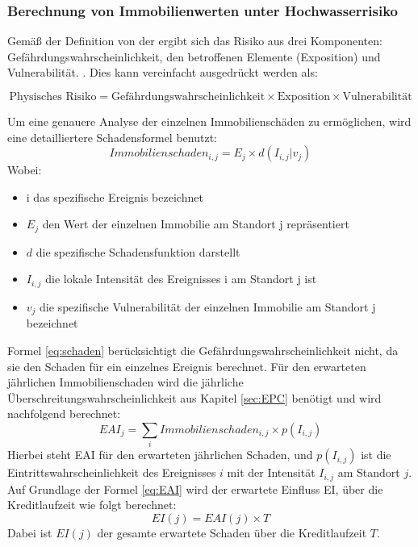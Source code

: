\subsubsection{Berechnung von Immobilienwerten unter Hochwasserrisiko}
Gemäß der Definition von der \textcite{undro1979} ergibt sich das Risiko aus drei Komponenten: Gefährdungswahrscheinlichkeit,  den betroffenen Elemente (Exposition) und Vulnerabilität. \parencite{coburn1991vulnerability}. Dies kann vereinfacht ausgedrückt werden als:

\begin{equation}
    \text{Physisches Risiko} = \text{Gefährdungswahrscheinlichkeit} \times \text{Exposition} \times \text{Vulnerabilität}
\end{equation}

Um eine genauere Analyse der einzelnen Immobilienschäden zu ermöglichen, wird eine detailliertere Schadensformel \parencite{vanweddingen2023physicalrisk} benutzt:
\begin{equation}
    Immobilienschaden_{i,j} = E_j \times d(I_{i,j}|v_j)
    \label{eq:schaden}
\end{equation}
Wobei:
\begin{itemize}
    \item i das spezifische Ereignis bezeichnet
    \item $E_j$ den Wert der einzelnen Immobilie am Standort j repräsentiert
    \item $d$ die spezifische Schadensfunktion darstellt
    \item $I_{i,j}$ die lokale Intensität des Ereignisses i am Standort j ist
    \item $v_j$ die spezifische Vulnerabilität der einzelnen Immobilie am Standort j bezeichnet
\end{itemize}

Formel \ref{eq:schaden} berücksichtigt die Gefährdungswahrscheinlichkeit nicht, da sie den Schaden für ein einzelnes Ereignis berechnet. Für den erwarteten jährlichen Immobilienschaden wird die jährliche Überschreitungswahrscheinlichkeit aus Kapitel \ref{sec:EPC} benötigt und wird nachfolgend berechnet:
\begin{equation}
    EAI_j = \sum_i Immobilienschaden_{i,j} \times p(I_{i,j})
    \label{eq:EAI}
\end{equation}
Hierbei steht \acs{EAI} für den erwarteten jährlichen Schaden, und \( p(I_{i,j}) \) ist die Eintrittswahrscheinlichkeit des Ereignisses \( i \) mit der Intensität \( I_{i,j} \) am Standort \( j \).
Auf Grundlage der Formel \ref{eq:EAI} wird der erwartete Einfluss \acs{EI}, über die Kreditlaufzeit wie folgt berechnet:
\begin{equation}
    EI(j) = EAI(j) \times T
\end{equation}
Dabei ist \( EI(j) \) der gesamte erwartete Schaden über die Kreditlaufzeit \( T \).

